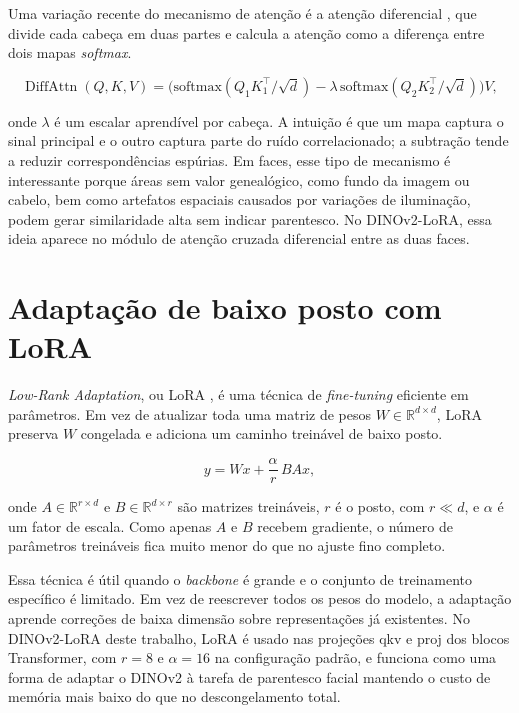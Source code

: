 Uma variação recente do mecanismo de atenção é a atenção diferencial \cite{ye2024differential},
que divide cada cabeça em duas partes e calcula a atenção como a diferença entre dois mapas \textit{softmax}.

\begin{equation}
\operatorname{DiffAttn}(Q, K, V) = \big( \mathrm{softmax}(Q_1 K_1^\top / \sqrt{d}) - \lambda \, \mathrm{softmax}(Q_2 K_2^\top / \sqrt{d}) \big) V,
\label{eq:diff_attn}
\end{equation}

onde $\lambda$ é um escalar aprendível por cabeça. A intuição é que um mapa captura o sinal principal e o outro captura parte do ruído correlacionado; a subtração tende a reduzir correspondências espúrias. Em faces, esse tipo de mecanismo é interessante porque áreas sem valor genealógico, como fundo da imagem ou cabelo, bem como artefatos espaciais causados por variações de iluminação, podem gerar similaridade alta sem indicar parentesco. No DINOv2-LoRA, essa ideia aparece no módulo de atenção cruzada diferencial entre as duas faces.

\section{Adaptação de baixo posto com LoRA}

\textit{Low-Rank Adaptation}, ou LoRA \cite{hu2021lora},
é uma técnica de \textit{fine-tuning} eficiente em parâmetros. Em vez de atualizar toda uma matriz de pesos $W \in \mathbb{R}^{d \times d}$, LoRA preserva $W$ congelada e adiciona um caminho treinável de baixo posto.

\begin{equation}
y = Wx + \frac{\alpha}{r} \, B A x,
\label{eq:lora}
\end{equation}

onde $A \in \mathbb{R}^{r \times d}$ e $B \in \mathbb{R}^{d \times r}$ são matrizes treináveis, $r$ é o posto, com $r \ll d$, e $\alpha$ é um fator de escala. Como apenas $A$ e $B$ recebem gradiente, o número de parâmetros treináveis fica muito menor do que no ajuste fino completo.

Essa técnica é útil quando o \textit{backbone} é grande e o conjunto de treinamento específico é limitado. Em vez de reescrever todos os pesos do modelo, a adaptação aprende correções de baixa dimensão sobre representações já existentes. No DINOv2-LoRA deste trabalho, LoRA é usado nas projeções qkv e proj dos blocos Transformer, com $r=8$ e $\alpha=16$ na configuração padrão, e funciona como uma forma de adaptar o DINOv2 à tarefa de parentesco facial mantendo o custo de memória mais baixo do que no descongelamento total.

